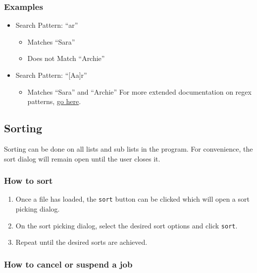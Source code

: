 \documentclass[english,floatsintext,man]{apa6}
\providecommand{\tightlist}{%
  \setlength{\itemsep}{0pt}\setlength{\parskip}{0pt}}
\begin{document}
\subsubsection{Examples}\label{examples}

\begin{itemize}
\tightlist
\item
  Search Pattern: \enquote{ar}

  \begin{itemize}
  \tightlist
  \item
    Matches \enquote{Sara}
  \item
    Does not Match \enquote{Archie}
  \end{itemize}
\item
  Search Pattern: \enquote{{[}A\textbar{}a{]}r}

  \begin{itemize}
  \tightlist
  \item
    Matches \enquote{Sara} and \enquote{Archie} For more extended
    documentation on regex patterns,
    \href{http://docs.oracle.com/javase/8/docs/api/java/util/regex/Pattern.html}{go
    here}.
  \end{itemize}
\end{itemize}

\subsection{Sorting}\label{sorting}

Sorting can be done on all lists and sub lists in the program. For
convenience, the sort dialog will remain open until the user closes it.

\subsubsection{How to sort}\label{how-to-sort}

\begin{enumerate}
\def\labelenumi{\arabic{enumi}.}
\tightlist
\item
  Once a file has loaded, the \texttt{sort} button can be clicked which
  will open a sort picking dialog.
\item
  On the sort picking dialog, select the desired sort options and click
  \texttt{sort}.
\item
  Repeat until the desired sorts are achieved.
\end{enumerate}

\subsubsection{How to cancel or suspend a
job}\label{how-to-cancel-or-suspend-a-job}
\end{document}
